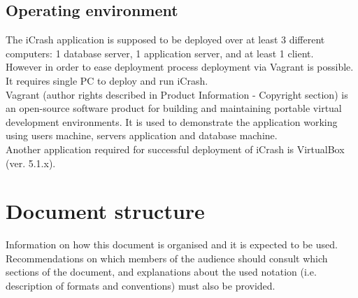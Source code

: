 \subsection{Operating environment}
The iCrash application is supposed to be deployed over at least 3 different
computers: 1 database server, 1 application server, and at least 1 client.\\

However in order to ease deployment process deployment via Vagrant is possible.
It requires single PC to deploy and run iCrash.\\

Vagrant (author rights described in Product Information - Copyright section) is
an open-source software product for building and maintaining portable virtual
development environments. It is used to demonstrate the application working using users machine, servers application and database machine.\\

Another application required for successful deployment of iCrash is VirtualBox
(ver. 5.1.x). \\

\section{Document structure}  
Information on how this document is organised and it is expected to be
used. Recommendations on which members of the audience
should consult which sections of the document, and explanations about the used
notation (i.e. description of formats and conventions) must also be provided.





